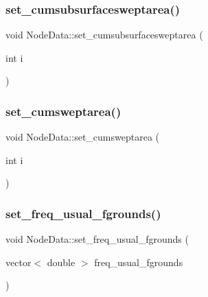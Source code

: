 \subsubsection{\texorpdfstring{set\_cumsubsurfacesweptarea()}{set\_cumsubsurfacesweptarea()}}
{\footnotesize\ttfamily void Node\+Data\+::set\+\_\+cumsubsurfacesweptarea (\begin{DoxyParamCaption}\item[{int}]{i }\end{DoxyParamCaption})\hspace{0.3cm}{\ttfamily [inline]}}

\mbox{\label{class_node_data_a273d0cf57afd478995096541d4fbbace}} 
\subsubsection{\texorpdfstring{set\_cumsweptarea()}{set\_cumsweptarea()}}
{\footnotesize\ttfamily void Node\+Data\+::set\+\_\+cumsweptarea (\begin{DoxyParamCaption}\item[{int}]{i }\end{DoxyParamCaption})\hspace{0.3cm}{\ttfamily [inline]}}

\mbox{\label{class_node_data_a17b4f94bb1ca20d974e800138606ae95}} 
\subsubsection{\texorpdfstring{set\_freq\_usual\_fgrounds()}{set\_freq\_usual\_fgrounds()}}
{\footnotesize\ttfamily void Node\+Data\+::set\+\_\+freq\+\_\+usual\+\_\+fgrounds (\begin{DoxyParamCaption}\item[{vector$<$ double $>$}]{freq\+\_\+usual\+\_\+fgrounds }\end{DoxyParamCaption})\hspace{0.3cm}{\ttfamily [inline]}}

\mbox{\label{class_node_data_a148595b384448cdc8a2dff4f8b9b7e9a}} 
